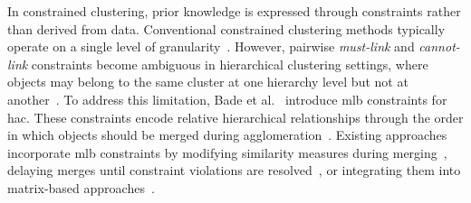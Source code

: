 In constrained clustering, prior knowledge is expressed through constraints rather than derived from data.
Conventional constrained clustering methods typically operate on a single level of granularity~\cite{wagstaff2001constrained}.
However, pairwise \textit{must-link} and \textit{cannot-link} constraints become ambiguous in hierarchical clustering settings, where objects may belong to the same cluster at one hierarchy level but not at another~\cite{bade_hierarchical_2014}.
To address this limitation, Bade et al.~\cite{bade2006personalized,bade_creating_2008} introduce \ac{mlb} constraints for \ac{hac}.
These constraints encode relative hierarchical relationships through the order in which objects should be merged during agglomeration~\cite{bade2006personalized,bade_creating_2008,bade_hierarchical_2014}.
Existing approaches incorporate \ac{mlb} constraints by modifying similarity measures during merging~\cite{bade2006personalized}, delaying merges until constraint violations are resolved~\cite{zhao2010hierarchical}, or integrating them into matrix-based approaches~\cite{zheng2011semi}.




